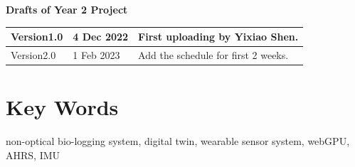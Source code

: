 \documentclass[11pt, a4paper]{article}
\begin{document}
\begin{center}
	\textbf{\large Drafts of Year 2 Project}
\end{center}

\begin{table}[!ht]
	\centering
	\begin{tabular}{|p{2cm}|p{2cm}|p{6cm}|}
		\hline
		Version1.0 & 4 Dec 2022
		& First uploading by Yixiao Shen.
		\\ \hline
		Version2.0 & 1 Feb 2023
		& Add the schedule for first 2 weeks.
		\\ \hline
	\end{tabular}\label{tab:table}
\end{table}

\section{Key Words}
non-optical bio-logging system, digital twin, wearable sensor system, webGPU, AHRS, IMU
\end{document}
